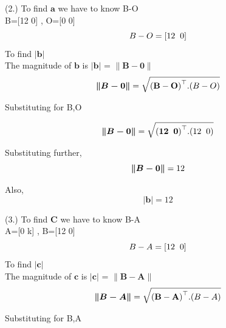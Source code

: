 \documentclass[10pt,a4paper]{report}
\begin{document}
\begin{multicols}{2}
(2.) To find $\boldsymbol{a}$  we have to know B-O\\\vspace{2mm}
    B=[12 0] , O=[0 0] \\
    \begin{equation}
    B-O = [12 \hspace{2mm} 0]
\end{equation}
To find $\boldsymbol{|b|}$ \vspace{2mm}\\
The magnitude of $\boldsymbol{b}$ is  $\boldsymbol{|b|}$ = $\boldsymbol{\|B-0\|}$
\vspace{2mm}
\begin{equation}
  \boldsymbol{\|B-0\|} = \sqrt{ \mathbf{(B-O)}^\top.(B-O)}\vspace{2mm} 
    \end{equation}
    \raggedright Substituting for B,O \\\vspace{2mm}
    
    \begin{equation}
\boldsymbol{\|B-0\|} = \sqrt{ \mathbf{(12 \hspace{2mm} 0)}^\top.(12 \hspace{2mm}
0)}\vspace{2mm}
  \end{equation}
\raggedright Substituting further,\\ 
\begin{equation}
\boldsymbol{\|B-0\|} = 12\vspace{2mm}
 \end{equation}
 \raggedright Also,
 \begin{equation}
     \boldsymbol{|b|} = 12
 \end{equation}

(3.) To find $\boldsymbol{C}$  we have to know B-A\\\vspace{2mm}
    A=[0 k] , B=[12 0] \\
    \begin{equation}
    B-A = [12 \hspace{2mm} 0]
\end{equation}
To find $\boldsymbol{|c|}$ \vspace{2mm}\\
The magnitude of $\boldsymbol{c}$ is  $\boldsymbol{|c|}$ = $\boldsymbol{\|B-A\|}$
\vspace{2mm}
\begin{equation}
   \boldsymbol{\|B-A\|} = \sqrt{ \mathbf{(B-A)}^\top.(B-A)}\vspace{2mm} 
\end{equation}
    \raggedright Substituting for B,A \\\vspace{2mm}
    

\end{multicols}
\end{document}
